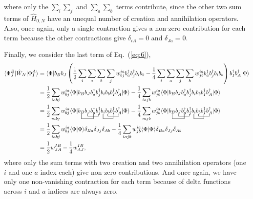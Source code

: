 \documentclass[a4paper]{article}
\newcommand{\eq} [1]{Eq.\ (\ref{eq:#1})}
\newcommand{\nn}{\nonumber}
\begin{document}
where only the $\sum_i\sum_j$ and $\sum_a\sum_b$ terms contribute, since the other two sum terms of $\hat{H}_{0,N}$ have an unequal number of creation and annihilation operators. Also, once again, only a single contraction gives a non-zero contribution for each term because the other contractions give $\delta_{iA}=0$ and $\delta_{Ja}=0$.

Finally, we consider the last term of \eq{6},
\begin{align}
\langle \Phi^B_J | \hat{W}_N | \Phi^A_I \rangle &= \langle \Phi |b_Bb_J \left( \frac{1}{2}\sum_i\sum_a\sum_b\sum_j w^{ia}_{bj}b_a^\dagger b_j^\dagger b_i b_b - \frac{1}{4}\sum_i\sum_a\sum_j\sum_b w^{ia}_{jb} b_a^\dagger b_j^\dagger b_i b_b\right) b_I^\dagger b_A^\dagger| \Phi \rangle \nn\\
&= \frac{1}{2}\sum_{iabj} w^{ia}_{bj} \langle \Phi |b_Bb_J b_a^\dagger b_j^\dagger b_i b_b b_I^\dagger b_A^\dagger| \Phi \rangle - \frac{1}{4}\sum_{iajb} w^{ia}_{jb}\langle \Phi |b_Bb_J b_a^\dagger b_j^\dagger b_i b_b b_I^\dagger b_A^\dagger| \Phi \rangle \nn\\
&= \frac{1}{2}\sum_{iabj} w^{ia}_{bj} \langle \Phi | \bcontraction[2ex]{}{b_B}{b_J}{b_a^\dagger}\bcontraction{b_B}{b_J}{b_a^\dagger}{b_j^\dagger}\bcontraction[2ex]{b_Bb_J b_a^\dagger b_j^\dagger}{b_i}{b_b}{b_I^\dagger}\bcontraction{b_Bb_J b_a^\dagger b_j^\dagger b_i}{b_b}{b_I^\dagger}{b_A^\dagger}b_Bb_J b_a^\dagger b_j^\dagger b_i b_b b_I^\dagger b_A^\dagger| \Phi \rangle - \frac{1}{4}\sum_{iajb} w^{ia}_{jb}\langle \Phi |\bcontraction[2ex]{}{b_B}{b_J}{b_a^\dagger}\bcontraction{b_B}{b_J}{b_a^\dagger}{b_j^\dagger}\bcontraction[2ex]{b_Bb_J b_a^\dagger b_j^\dagger}{b_i}{b_b}{b_I^\dagger}\bcontraction{b_Bb_J b_a^\dagger b_j^\dagger b_i}{b_b}{b_I^\dagger}{b_A^\dagger}b_Bb_J b_a^\dagger b_j^\dagger b_i b_b b_I^\dagger b_A^\dagger| \Phi \rangle \nn\\
&= \frac{1}{2}\sum_{iabj} w^{ia}_{bj} \langle \Phi | \Phi \rangle\delta_{Ba}\delta_{Jj}\delta_{Ab} - \frac{1}{4}\sum_{iajb} w^{ia}_{jb}\langle \Phi | \Phi \rangle\delta_{Ba}\delta_{Jj}\delta_{Ab} \nn\\ 
&= \frac{1}{2}w^{IB}_{JA} - \frac{1}{4}w^{IB}_{AJ},
\end{align}
where only the sum terms with two creation and two annihilation operators (one $i$ and one $a$ index each) give non-zero contributions. And once again, we have only one non-vanishing contraction for each term because of delta functions across $i$ and $a$ indices are always zero. 
\end{document}
